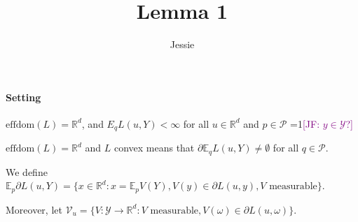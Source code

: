 \documentclass{article}
\title{Lemma 1}
\author{Jessie}
\newcommand{\Comments}{1}
\newcommand{\mynote}[2]{\ifnum\Comments=1\textcolor{#1}{#2}\fi}
\newcommand{\jessie}[1]{\mynote{purple}{[JF: #1]}}
\newcommand{\reals}{\mathbb{R}}
\newcommand{\effdom}{\mathrm{effdom}}
\newcommand{\E}{\mathbb{E}}
\renewcommand{\P}{\mathcal{P}}
\newcommand{\V}{\mathcal{V}}
\newcommand{\Y}{\mathcal{Y}}
\begin{document}
\maketitle
\paragraph{Setting} 
$\effdom(L) = \reals^d$, and $E_q L(u,Y) < \infty$ for all $u \in \reals^d$ and $p \in \P$ \jessie{$y \in \Y$?}

$\effdom(L) = \reals^d$ and $L$ convex means that $\partial \E_q L(u,Y) \neq \emptyset$ for all $q \in \P$.

We define $\E_p \partial L(u,Y) = \{x \in \reals^d : x = \E_p V(Y), V(y) \in \partial L(u,y), V \text{ measurable}\}$.

Moreover, let $\V_{u} = \{V : \Y \to \reals^d : V \text{ measurable}, V(\omega) \in \partial L(u,\omega)\}$.
\end{document}
